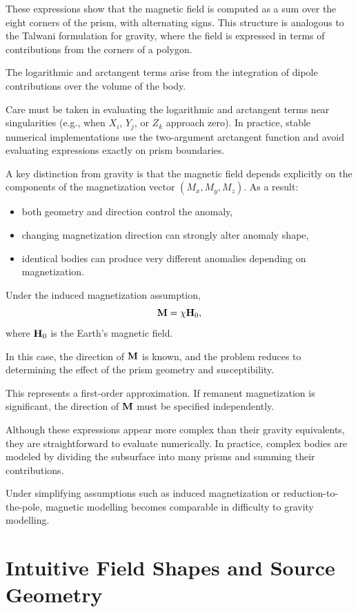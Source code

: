 These expressions show that the magnetic field is computed as a sum over the eight corners of the prism, with alternating signs. This structure is analogous to the Talwani formulation for gravity, where the field is expressed in terms of contributions from the corners of a polygon.

The logarithmic and arctangent terms arise from the integration of dipole contributions over the volume of the body.

Care must be taken in evaluating the logarithmic and arctangent terms near singularities (e.g., when $X_i$, $Y_j$, or $Z_k$ approach zero). In practice, stable numerical implementations use the two-argument arctangent function and avoid evaluating expressions exactly on prism boundaries.

A key distinction from gravity is that the magnetic field depends explicitly on the components of the magnetization vector $(M_x, M_y, M_z)$. As a result:
\begin{itemize}
    \item both geometry and direction control the anomaly,
    \item changing magnetization direction can strongly alter anomaly shape,
    \item identical bodies can produce very different anomalies depending on magnetization.
\end{itemize}

Under the induced magnetization assumption,
\begin{equation}
    \vb{M} = \chi \vb{H}_0,
\end{equation}
where $\vb{H}_0$ is the Earth's magnetic field.

In this case, the direction of $\vb{M}$ is known, and the problem reduces to determining the effect of the prism geometry and susceptibility.

This represents a first-order approximation. If remanent magnetization is significant, the direction of $\vb{M}$ must be specified independently.

Although these expressions appear more complex than their gravity equivalents, they are straightforward to evaluate numerically. In practice, complex bodies are modeled by dividing the subsurface into many prisms and summing their contributions.

Under simplifying assumptions such as induced magnetization or reduction-to-the-pole, magnetic modelling becomes comparable in difficulty to gravity modelling.


\section{Intuitive Field Shapes and Source Geometry}

